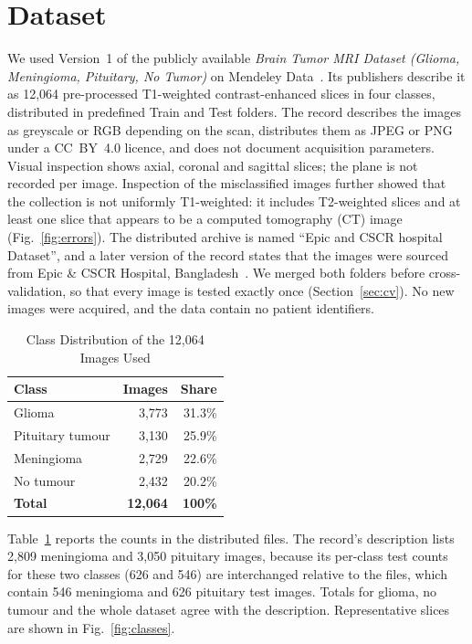 \documentclass[journal,onecolumn]{IEEEtran}
\begin{document}
\section{Dataset}\label{sec:data}
We used Version~1 of the publicly available \textit{Brain Tumor MRI Dataset (Glioma, Meningioma, Pituitary, No Tumor)} on Mendeley Data~\cite{hira2025mendeley}. Its publishers describe it as 12,064 pre-processed T1-weighted contrast-enhanced slices in four classes, distributed in predefined Train and Test folders. The record describes the images as greyscale or RGB depending on the scan, distributes them as JPEG or PNG under a CC~BY~4.0 licence, and does not document acquisition parameters. Visual inspection shows axial, coronal and sagittal slices; the plane is not recorded per image. Inspection of the misclassified images further showed that the collection is not uniformly T1-weighted: it includes T2-weighted slices and at least one slice that appears to be a computed tomography (CT) image (Fig.~\ref{fig:errors}). The distributed archive is named ``Epic and CSCR hospital Dataset'', and a later version of the record states that the images were sourced from Epic \& CSCR Hospital, Bangladesh~\cite{bdneuro2025v7}. We merged both folders before cross-validation, so that every image is tested exactly once (Section~\ref{sec:cv}). No new images were acquired, and the data contain no patient identifiers.

\begin{table}[!t]
\caption{Class Distribution of the 12,064 Images Used}
\label{tab:classes}
\centering
\begin{tabular}{@{}lrr@{}}
\toprule
Class & Images & Share \\
\midrule
Glioma & 3,773 & 31.3\% \\
Pituitary tumour & 3,130 & 25.9\% \\
Meningioma & 2,729 & 22.6\% \\
No tumour & 2,432 & 20.2\% \\
\midrule
\textbf{Total} & \textbf{12,064} & \textbf{100\%} \\
\bottomrule
\end{tabular}
\end{table}

Table~\ref{tab:classes} reports the counts in the distributed files. The record's description lists 2,809 meningioma and 3,050 pituitary images, because its per-class test counts for these two classes (626 and 546) are interchanged relative to the files, which contain 546 meningioma and 626 pituitary test images. Totals for glioma, no tumour and the whole dataset agree with the description. Representative slices are shown in Fig.~\ref{fig:classes}.
\end{document}
